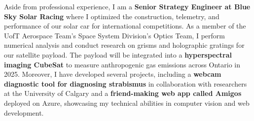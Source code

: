 \documentclass[10.5pt,a4]{article}
\begin{document}
Aside from professional experience, I am a \textbf{Senior Strategy Engineer at Blue Sky Solar Racing} where I optimized the construction, telemetry, and performance of our solar car for international competitions. As a member of the UofT Aerospace Team's Space System Division's Optics Team, I perform numerical analysis and conduct research on grisms and holographic gratings for our satellite payload. The payload will be integrated into a \textbf{hyperspectral imaging CubeSat} to measure anthropogenic gas emissions across Ontario in 2025. Moreover, I have developed several projects, including a \textbf{webcam diagnostic tool for diagnosing strabismus} in collaboration with researchers at the University of Calgary and a \textbf{friend-making web app called Amigos} deployed on Azure, showcasing my technical abilities in computer vision and web development.
\end{document}
